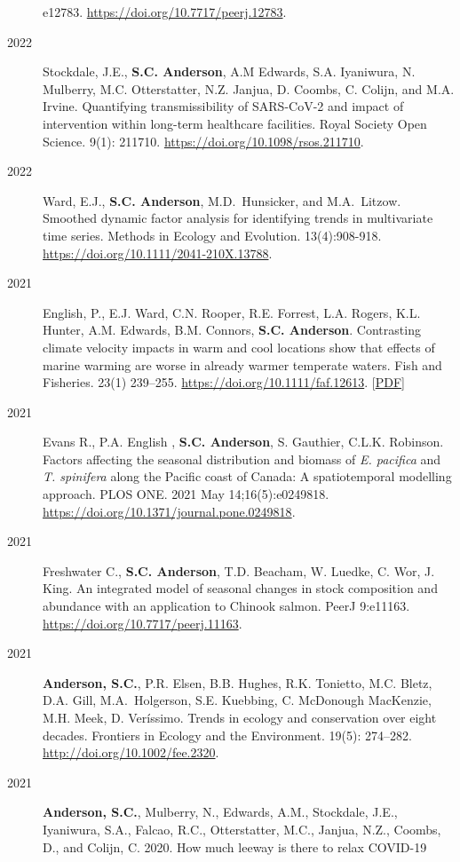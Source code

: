 \begin{description}
e12783. \url{https://doi.org/10.7717/peerj.12783}.
\item[2022]
Stockdale, J.E., \textbf{S.C. Anderson}, A.M Edwards, S.A. Iyaniwura, N.
Mulberry, M.C. Otterstatter, N.Z. Janjua, D. Coombs, C. Colijn, and M.A.
Irvine. Quantifying transmissibility of SARS-CoV-2 and impact of
intervention within long-term healthcare facilities. Royal Society Open
Science. 9(1): 211710. \url{https://doi.org/10.1098/rsos.211710}.
\item[2022]
Ward, E.J., \textbf{S.C. Anderson}, M.D.\ Hunsicker, and M.A.\ Litzow.
Smoothed dynamic factor analysis for identifying trends in multivariate
time series. Methods in Ecology and Evolution. 13(4):908-918.
\url{https://doi.org/10.1111/2041-210X.13788}.
\item[2021]
English, P., E.J. Ward, C.N. Rooper, R.E. Forrest, L.A. Rogers, K.L.
Hunter, A.M. Edwards, B.M. Connors, \textbf{S.C. Anderson}. Contrasting
climate velocity impacts in warm and cool locations show that effects of
marine warming are worse in already warmer temperate waters. Fish and
Fisheries. 23(1) 239--255. \url{https://doi.org/10.1111/faf.12613}.
{[}\href{https://www.dropbox.com/s/cmkzlxgiez6rzc0/English_etal_2022_contrasting_climate_velocity.pdf?dl=1}{PDF}{]}
\item[2021]
Evans R., P.A. English , \textbf{S.C. Anderson}, S. Gauthier, C.L.K.
Robinson. Factors affecting the seasonal distribution and biomass of
\emph{E. pacifica} and \emph{T. spinifera} along the Pacific coast of
Canada: A spatiotemporal modelling approach. PLOS ONE. 2021 May
14;16(5):e0249818. \url{https://doi.org/10.1371/journal.pone.0249818}.
\item[2021]
Freshwater C., \textbf{S.C. Anderson}, T.D. Beacham, W. Luedke, C. Wor,
J. King. An integrated model of seasonal changes in stock composition
and abundance with an application to Chinook salmon. PeerJ 9:e11163.
\url{https://doi.org/10.7717/peerj.11163}.
\item[2021]
\textbf{Anderson, S.C.}, P.R. Elsen, B.B. Hughes, R.K. Tonietto, M.C.
Bletz, D.A. Gill, M.A.\ Holgerson, S.E. Kuebbing, C. McDonough MacKenzie,
M.H. Meek, D. Veríssimo. Trends in ecology and conservation over eight
decades. Frontiers in Ecology and the Environment. 19(5): 274--282.
\url{http://doi.org/10.1002/fee.2320}.
\item[2021]
\textbf{Anderson, S.C.}, Mulberry, N., Edwards, A.M., Stockdale, J.E.,
Iyaniwura, S.A., Falcao, R.C., Otterstatter, M.C., Janjua, N.Z., Coombs,
D., and Colijn, C. 2020. How much leeway is there to relax COVID-19

\end{description}
